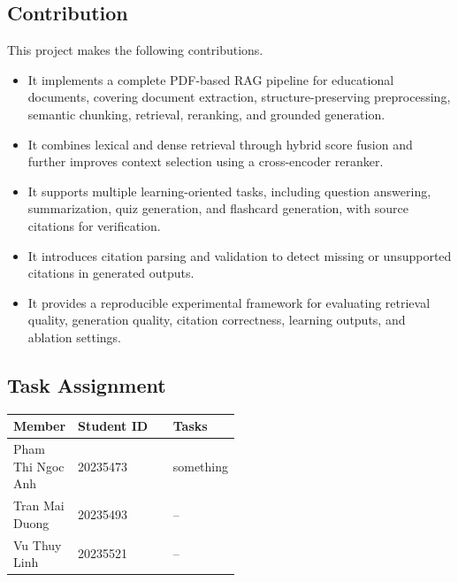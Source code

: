 \documentclass[11pt,a4paper]{article}
\begin{document}
\subsection{Contribution}

This project makes the following contributions.

\begin{itemize}
\item It implements a complete PDF-based RAG pipeline for educational
documents, covering document extraction, structure-preserving
preprocessing, semantic chunking, retrieval, reranking, and grounded
generation.

\item It combines lexical and dense retrieval through hybrid score fusion
and further improves context selection using a cross-encoder reranker.

\item It supports multiple learning-oriented tasks, including question
answering, summarization, quiz generation, and flashcard generation, with
source citations for verification.

\item It introduces citation parsing and validation to detect missing or
unsupported citations in generated outputs.

\item It provides a reproducible experimental framework for evaluating
retrieval quality, generation quality, citation correctness, learning
outputs, and ablation settings.

\end{itemize}


\subsection{Task Assignment}

\begin{table}[H]
\centering
\label{tab:task-assignment}
\begin{tabularx}{\textwidth}{p{0.23\linewidth}X p{0.28\linewidth}}
\toprule
Member & Student ID & Tasks \\
\midrule
Pham Thi Ngoc Anh & 20235473 & something \\
Tran Mai Duong & 20235493 & -- \\
Vu Thuy Linh & 20235521 & -- \\
\bottomrule
\end{tabularx}
\end{table}
\end{document}
